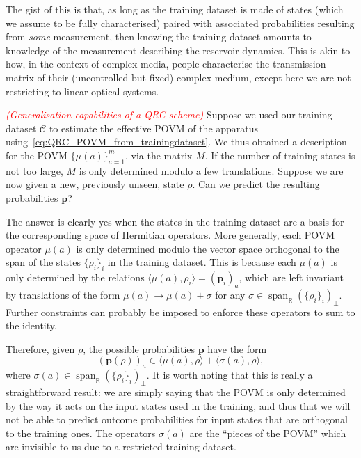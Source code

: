 \documentclass[12pt]{report}
\newcommand{\RR}{\mathbb{R}}
\newcommand{\on}[1]{\operatorname{#1}}
\newcommand{\bs}[1]{\boldsymbol{#1}}
\newcommand{\calC}{{\mathcal{C}}}
\begin{document}
The gist of this is that, as long as the training dataset is made of states (which we assume to be fully characterised) paired with associated probabilities resulting from \emph{some} measurement, then knowing the training dataset amounts to knowledge of the measurement describing the reservoir dynamics.
This is akin to how, in the context of complex media, people characterise the transmission matrix of their (uncontrolled but fixed) complex medium, except here we are not restricting to linear optical systems.

\textcolor{red}{\emph{(Generalisation capabilities of a QRC scheme)}}
Suppose we used our training dataset $\calC$ to estimate the effective POVM of the apparatus using~\cref{eq:QRC_POVM_from_trainingdataset}.
We thus obtained a description for the POVM $\{\mu(a)\}_{a=1}^m$, via the matrix $M$.
If the number of training states is not too large, $M$ is only determined modulo a few translations.
Suppose we are now given a new, previously unseen, state $\rho$.
Can we predict the resulting probabilities $\bs p$?

The answer is clearly yes when the states in the training dataset are a basis for the corresponding space of Hermitian operators.
More generally, each POVM operator $\mu(a)$ is only determined modulo the vector space orthogonal to the span of the states $\{\rho_i\}_i$ in the training dataset. This is because each $\mu(a)$ is only determined by the relations
	$\langle \mu(a), \rho_i \rangle = (\bs p_i)_a$,
which are left invariant by translations of the form
$\mu(a)\to \mu(a) + \sigma$ for any $\sigma\in\on{span}_\RR(\{\rho_i\}_i)_\perp$.
Further constraints can probably be imposed to enforce these operators to sum to the identity.

Therefore, given $\rho$, the possible probabilities $\bs p$ have the form
\begin{equation}
	(\bs p(\rho))_a \in \langle \mu(a), \rho\rangle + \langle \sigma(a),\rho\rangle,
\end{equation}
where $\sigma(a)\in\on{span}_\RR(\{\rho_i\}_i)_\perp$.
It is worth noting that this is really a straightforward result: we are simply saying that the POVM is only determined by the way it acts on the input states used in the training, and thus that we will not be able to predict outcome probabilities for input states that are orthogonal to the training ones.
The operators $\sigma(a)$ are the ``pieces of the POVM'' which are invisible to us due to a restricted training dataset.
\end{document}
